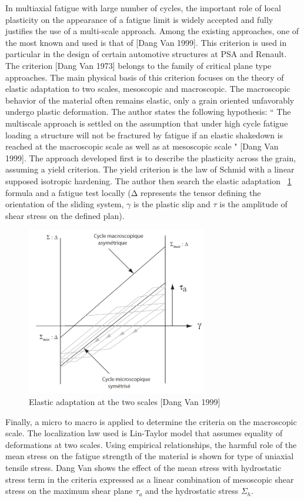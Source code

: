 \documentclass[3p,times,procedia,number]{elsarticle}
\newcommand{\figref}[1]{\figurename~\ref{#1}}
\begin{document}
In multiaxial fatigue with large number of cycles, the important role of local plasticity on the appearance of a fatigue limit is widely accepted and fully justifies the use of a multi-scale approach. Among the existing approaches, one of the most known and used is that of [Dang Van 1999]. This criterion is used in particular in the design of certain automotive structures at PSA and
Renault. The criterion [Dang Van 1973] belongs to the family of critical plane type approaches. The main physical
basis of this criterion focuses on the theory of elastic adaptation to two scales, mesoscopic and macroscopic. The macroscopic behavior of the material often remains elastic, only a grain oriented unfavorably undergo
plastic deformation. The author states the following hypothesis: `` The
multiscale approach is settled on the assumption that under high cycle fatigue loading a structure
will not be fractured by fatigue if an elastic shakedown is reached at the macroscopic scale as well
as at mesoscopic scale " [Dang Van 1999]. The approach developed first is
to describe the plasticity across the grain, assuming a yield criterion. The yield criterion is the law of Schmid with a
linear supposed isotropic hardening. The author then search the elastic adaptation \figref{figDV} formula and a fatigue
test locally (Δ represents the tensor defining the orientation of the sliding system, $\gamma$ is the plastic slip  and $\tau$
is the amplitude of shear stress on the defined plan).
\begin{figure}[!h]
	\centering
	\includegraphics[width=0.7\textwidth]{figures//DV.png} 
	\caption{Elastic adaptation at the two scales [Dang Van 1999]}
	\label{figDV}
\end{figure}
Finally, a micro to macro is applied to determine the criteria on the macroscopic scale. The localization law used is
Lin-Taylor model that assumes equality of deformations at two scales. Using empirical relationships, the harmful role of the mean stress on the fatigue
strength of the material is shown for type of uniaxial tensile stress. Dang Van shows the effect of the mean stress
with  hydrostatic stress term in the criteria expressed as a linear combination of mesoscopic  shear stress on the maximum shear plane $\tau_a$ and the hydrostatic stress $\Sigma_h$.
\end{document}
